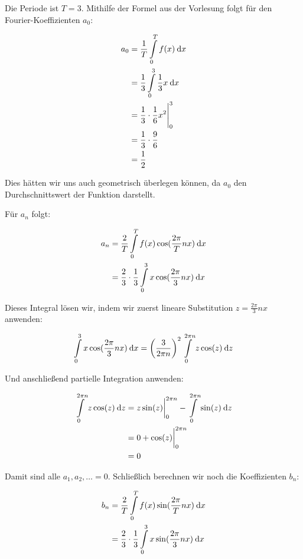 \item Die Periode ist $T=3$. Mithilfe der Formel aus der Vorlesung folgt für den Fourier-Koeffizienten $a_0$:

\begin{alignat*}{1}
	a_0 &= \frac{1}{T} \int\limits_0^T f(x) \:\mathrm{d}{x} \\
	    &= \frac{1}{3} \int\limits_0^3 \frac{1}{3}x \:\mathrm{d}{x} \\
	    &= \frac{1}{3} \cdot \frac{1}{6} x^2 \Biggr|_0^3 \\
	    &= \frac{1}{3} \cdot \frac{9}{6} \\
	    &= \frac{1}{2}
\end{alignat*}

Dies hätten wir uns auch geometrisch überlegen können, da $a_0$ den Durchschnittswert der Funktion darstellt.

Für $a_n$ folgt:

\begin{alignat*}{1}
	a_n &= \frac{2}{T} \int\limits_0^T f(x) \cos(\frac{2\pi}{T}nx) \:\mathrm{d}{x} \\
	    &= \frac{2}{3} \cdot \frac{1}{3} \int\limits_0^3 x \cos(\frac{2\pi}{3}nx) \:\mathrm{d}{x}
\end{alignat*}

Dieses Integral lösen wir, indem wir zuerst lineare Substitution $z=\frac{2\pi}{3}nx$ anwenden:

$$
	\int\limits_0^3 x \cos(\frac{2\pi}{3}nx) \:\mathrm{d}{x} = \left(\frac{3}{2\pi n}\right)^2 \int\limits_0^{2\pi n} z \cos(z) \:\mathrm{d}{z}
$$

Und anschließend partielle Integration anwenden:

\begin{alignat*}{1}
	\int\limits_0^{2\pi n} z \cos(z) \:\mathrm{d}{z} &= z \sin(z)\biggr|_0^{2\pi n} - \int\limits_0^{2\pi n} \sin(z) \:\mathrm{d}{z} \\
	                                          &= 0 + \cos(z)\biggr|_0^{2\pi n} \\
	                                          &= 0
\end{alignat*}

Damit sind alle $a_1,a_2,\dots=0$. Schließlich berechnen wir noch die Koeffizienten $b_n$:

\begin{alignat*}{1}
	b_n &= \frac{2}{T} \int\limits_0^T f(x) \sin(\frac{2\pi}{T}nx) \:\mathrm{d}{x} \\
	    &= \frac{2}{3} \cdot \frac{1}{3} \int\limits_0^3 x \sin(\frac{2\pi}{3}nx) \:\mathrm{d}{x}
\end{alignat*}

